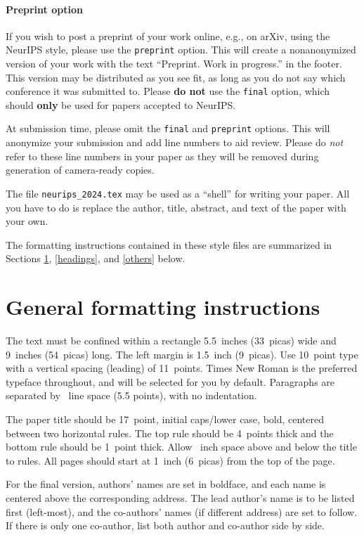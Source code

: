\documentclass{article}
\begin{document}
\paragraph{Preprint option}
If you wish to post a preprint of your work online, e.g., on arXiv, using the
NeurIPS style, please use the \verb+preprint+ option. This will create a
nonanonymized version of your work with the text ``Preprint. Work in progress.''
in the footer. This version may be distributed as you see fit, as long as you do not say which conference it was submitted to. Please \textbf{do
  not} use the \verb+final+ option, which should \textbf{only} be used for
papers accepted to NeurIPS.


At submission time, please omit the \verb+final+ and \verb+preprint+
options. This will anonymize your submission and add line numbers to aid
review. Please do \emph{not} refer to these line numbers in your paper as they
will be removed during generation of camera-ready copies.


The file \verb+neurips_2024.tex+ may be used as a ``shell'' for writing your
paper. All you have to do is replace the author, title, abstract, and text of
the paper with your own.


The formatting instructions contained in these style files are summarized in
Sections \ref{gen_inst}, \ref{headings}, and \ref{others} below.


\section{General formatting instructions}
\label{gen_inst}


The text must be confined within a rectangle 5.5~inches (33~picas) wide and
9~inches (54~picas) long. The left margin is 1.5~inch (9~picas).  Use 10~point
type with a vertical spacing (leading) of 11~points.  Times New Roman is the
preferred typeface throughout, and will be selected for you by default.
Paragraphs are separated by ~line space (5.5 points), with no
indentation.


The paper title should be 17~point, initial caps/lower case, bold, centered
between two horizontal rules. The top rule should be 4~points thick and the
bottom rule should be 1~point thick. Allow ~inch space above and
below the title to rules. All pages should start at 1~inch (6~picas) from the
top of the page.


For the final version, authors' names are set in boldface, and each name is
centered above the corresponding address. The lead author's name is to be listed
first (left-most), and the co-authors' names (if different address) are set to
follow. If there is only one co-author, list both author and co-author side by
side.
\end{document}

